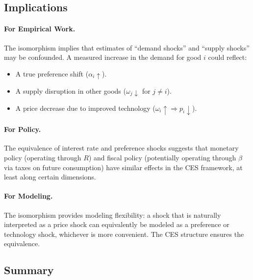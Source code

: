 \subsection{Implications}
\label{subsec:ac-iso-implications}

\paragraph{For Empirical Work.}
The isomorphism implies that estimates of ``demand shocks'' and ``supply shocks'' may be confounded. A measured increase in the demand for good $i$ could reflect:
\begin{itemize}[nosep]
\item A true preference shift ($\alpha_i \uparrow$).
\item A supply disruption in other goods ($\omega_j \downarrow$ for $j \neq i$).
\item A price decrease due to improved technology ($\omega_i \uparrow \Rightarrow p_i \downarrow$).
\end{itemize}

\paragraph{For Policy.}
The equivalence of interest rate and preference shocks suggests that monetary policy (operating through $R$) and fiscal policy (potentially operating through $\beta$ via taxes on future consumption) have similar effects in the CES framework, at least along certain dimensions.

\paragraph{For Modeling.}
The isomorphism provides modeling flexibility: a shock that is naturally interpreted as a price shock can equivalently be modeled as a preference or technology shock, whichever is more convenient. The CES structure ensures the equivalence.

\subsection{Summary}
\label{subsec:ac-iso-summary}

